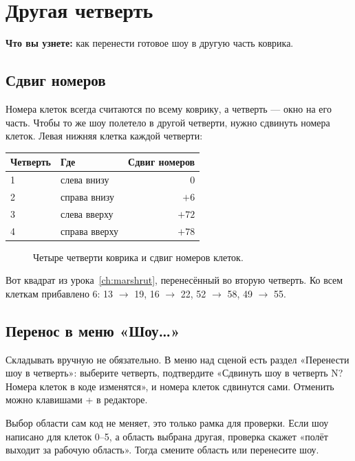\chapter{Другая четверть}\label{ch:chetverti}

\textbf{Что вы узнете:} как перенести готовое шоу в другую часть коврика.

\section{Сдвиг номеров}

Номера клеток всегда считаются по всему коврику, а четверть --- окно на его часть. Чтобы то же шоу полетело в другой четверти, нужно сдвинуть номера клеток. Левая нижняя клетка каждой четверти:

\begin{center}
\begin{tabular}{@{}llr@{}}
\toprule
Четверть & Где & Сдвиг номеров \\
\midrule
1 & слева внизу & 0 \\
2 & справа внизу & $+6$ \\
3 & слева вверху & $+72$ \\
4 & справа вверху & $+78$ \\
\bottomrule
\end{tabular}
\end{center}

\begin{figure}[H]
  \centering
  
  \caption{Четыре четверти коврика и сдвиг номеров клеток.}\label{fig:quarters}
\end{figure}

Вот квадрат из урока~\ref{ch:marshrut}, перенесённый во вторую четверть. Ко всем клеткам прибавлено 6: 13 $\to$ 19, 16 $\to$ 22, 52 $\to$ 58, 49 $\to$ 55.


\section{Перенос в меню «Шоу…»}

Складывать вручную не обязательно. В меню  над сценой есть раздел «Перенести шоу в четверть»: выберите четверть, подтвердите «Сдвинуть шоу в четверть N? Номера клеток в коде изменятся», и номера клеток сдвинутся сами. Отменить можно клавишами + в редакторе.

\begin{vnimanie}
Выбор области сам код не меняет, это только рамка для проверки. Если шоу написано для клеток 0--5, а область выбрана другая, проверка скажет «полёт выходит за рабочую область». Тогда смените область или перенесите шоу.
\end{vnimanie}

